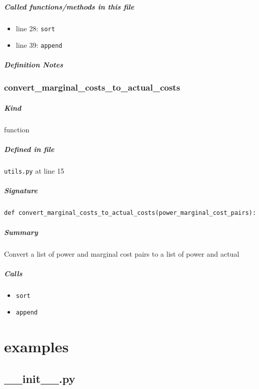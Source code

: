 \documentclass[11pt]{report}
\begin{document}
\paragraph{Called functions/methods in this file}
\begin{itemize}[leftmargin=*]
  \item line 28: \texttt{sort}
  \item line 39: \texttt{append}
\end{itemize}
\paragraph{Definition Notes}
\subsection{convert\_marginal\_costs\_to\_actual\_costs}
\label{def:utils.py:convert_marginal_costs_to_actual_costs:L15}
\paragraph{Kind} function
\paragraph{Defined in file} \texttt{utils.py} at line 15
\paragraph{Signature} \texttt{def convert\_marginal\_costs\_to\_actual\_costs(power\_marginal\_cost\_pairs):}
\paragraph{Summary} Convert a list of power and marginal cost pairs to a list of power and actual
\paragraph{Calls}
\begin{itemize}[leftmargin=*]
  \item \texttt{sort}
  \item \texttt{append}
\end{itemize}

\chapter{examples}
\section{\_\_init\_\_.py}
\label{file:examples-__init__.py}
\end{document}
